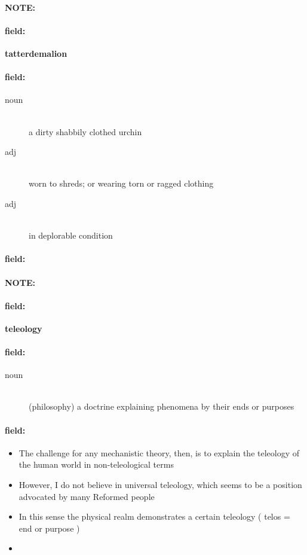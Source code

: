 \documentclass[12pt]{article}
\newenvironment{note}{\paragraph{NOTE:}}{}
\newenvironment{field}{\paragraph{field:}}{}
\begin{document}
\begin{note}
\begin{field}
\textbf{\large tatterdemalion}
\end{field}


\begin{field}
\begin{description}
\item[noun] \hfill \\ 
a dirty shabbily clothed urchin

\item[adj] \hfill \\ 
worn to shreds; or wearing torn or ragged clothing

\item[adj] \hfill \\ 
in deplorable condition

\end{description}
\end{field}

\begin{field}
\end{field}
\end{note}
\begin{note}
\begin{field}
\textbf{\large teleology}
\end{field}


\begin{field}
\begin{description}
\item[noun] \hfill \\ 
(philosophy) a doctrine explaining phenomena by their ends or purposes

\end{description}
\end{field}

\begin{field}
\begin{itemize}
\item The challenge for any mechanistic theory, then, is to explain the teleology of the human world in non-teleological terms
\item However, I do not believe in universal teleology, which seems to be a position advocated by many Reformed people
\item In this sense the physical realm demonstrates a certain teleology ( telos = end or purpose )
\item 
\end{itemize}
\end{field}
\end{note}
\end{document}
